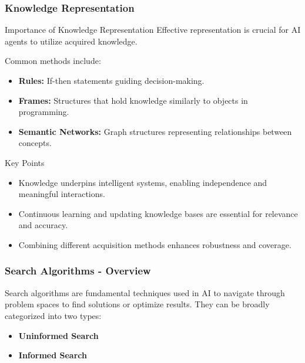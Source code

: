 \documentclass[aspectratio=169]{beamer}
\begin{document}
\begin{frame}[fragile]
    \frametitle{Knowledge Representation}
    \begin{block}{Importance of Knowledge Representation}
        Effective representation is crucial for AI agents to utilize acquired knowledge.
    \end{block}
    Common methods include:
    \begin{itemize}
        \item \textbf{Rules:} If-then statements guiding decision-making.
        \item \textbf{Frames:} Structures that hold knowledge similarly to objects in programming.
        \item \textbf{Semantic Networks:} Graph structures representing relationships between concepts.
    \end{itemize}
    
    \begin{block}{Key Points}
        \begin{itemize}
            \item Knowledge underpins intelligent systems, enabling independence and meaningful interactions.
            \item Continuous learning and updating knowledge bases are essential for relevance and accuracy.
            \item Combining different acquisition methods enhances robustness and coverage.
        \end{itemize}
    \end{block}
\end{frame}

\begin{frame}[fragile]
    \frametitle{Search Algorithms - Overview}
    Search algorithms are fundamental techniques used in AI to navigate through problem spaces to find solutions or optimize results. They can be broadly categorized into two types:
    
    \begin{itemize}
        \item \textbf{Uninformed Search}
        \item \textbf{Informed Search}
    \end{itemize}
\end{frame}
\end{document}
